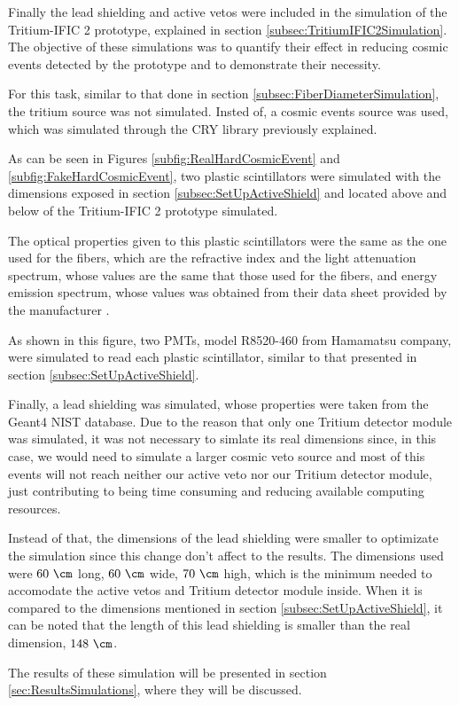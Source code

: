 Finally the lead shielding and active vetos were included in the simulation of the Tritium-IFIC 2 prototype, explained in section \ref{subsec:TritiumIFIC2Simulation}. The objective of these simulations was to quantify their effect in reducing cosmic events detected by the prototype and to demonstrate their necessity.

For this task, similar to that done in section \ref{subsec:FiberDiameterSimulation}, the tritium source was not simulated. Insted of, a cosmic events source was used, which was simulated through the CRY library previously explained.

As can be seen in Figures \ref{subfig:RealHardCosmicEvent} and \ref{subfig:FakeHardCosmicEvent}, two plastic scintillators were simulated with the dimensions exposed in section \ref{subsec:SetUpActiveShield} and located above and below of the Tritium-IFIC 2 prototype simulated. 

The optical properties given to this plastic scintillators were the same as the one used for the fibers, which are the refractive index and the light attenuation spectrum, whose values are the same that those used for the fibers, and energy emission spectrum, whose values was obtained from their data sheet provided by the manufacturer \cite{ScintillatorVeto}.

As shown in this figure, two PMTs, model R8520-460 from Hamamatsu company, were simulated to read each plastic scintillator, similar to that presented in section \ref{subsec:SetUpActiveShield}.

Finally, a lead shielding was simulated, whose properties were taken from the Geant4 NIST database. Due to the reason that only one Tritium detector module was simulated, it was not necessary to simlate its real dimensions since, in this case, we would need to simulate a larger cosmic veto source and most of this events will not reach neither our active veto nor our Tritium detector module, just contributing to being time consuming and reducing available computing resources.

Instead of that, the dimensions of the lead shielding were smaller to optimizate the simulation since this change don't affect to the results. The dimensions used were $60~\cm$ long, $60~\cm$ wide, $70~\cm$ high, which is the minimum needed to accomodate the active vetos and Tritium detector module inside. When it is compared to the dimensions mentioned in section \ref{subsec:SetUpActiveShield}, it can be noted that the length of this lead shielding is smaller than the real dimension, $148~\cm$.

The results of these simulation will be presented in section \ref{sec:ResultsSimulations}, where they will be discussed.
